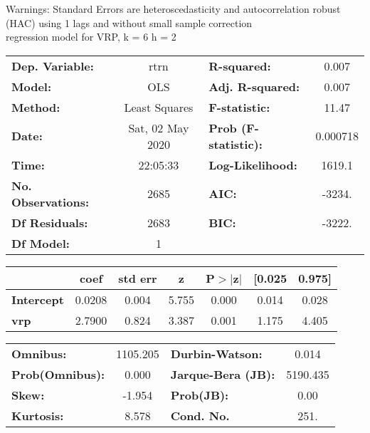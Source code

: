 Warnings: \newline
 [1] Standard Errors are heteroscedasticity and autocorrelation robust (HAC) using 1 lags and without small sample correction\\ 

regression model for VRP, k = 6 h = 2\begin{center}
\begin{tabular}{lclc}
\toprule
\textbf{Dep. Variable:}    &       rtrn       & \textbf{  R-squared:         } &     0.007   \\
\textbf{Model:}            &       OLS        & \textbf{  Adj. R-squared:    } &     0.007   \\
\textbf{Method:}           &  Least Squares   & \textbf{  F-statistic:       } &     11.47   \\
\textbf{Date:}             & Sat, 02 May 2020 & \textbf{  Prob (F-statistic):} &  0.000718   \\
\textbf{Time:}             &     22:05:33     & \textbf{  Log-Likelihood:    } &    1619.1   \\
\textbf{No. Observations:} &        2685      & \textbf{  AIC:               } &    -3234.   \\
\textbf{Df Residuals:}     &        2683      & \textbf{  BIC:               } &    -3222.   \\
\textbf{Df Model:}         &           1      & \textbf{                     } &             \\
\bottomrule
\end{tabular}
\begin{tabular}{lcccccc}
                   & \textbf{coef} & \textbf{std err} & \textbf{z} & \textbf{P$> |$z$|$} & \textbf{[0.025} & \textbf{0.975]}  \\
\midrule
\textbf{Intercept} &       0.0208  &        0.004     &     5.755  &         0.000        &        0.014    &        0.028     \\
\textbf{vrp}       &       2.7900  &        0.824     &     3.387  &         0.001        &        1.175    &        4.405     \\
\bottomrule
\end{tabular}
\begin{tabular}{lclc}
\textbf{Omnibus:}       & 1105.205 & \textbf{  Durbin-Watson:     } &    0.014  \\
\textbf{Prob(Omnibus):} &   0.000  & \textbf{  Jarque-Bera (JB):  } & 5190.435  \\
\textbf{Skew:}          &  -1.954  & \textbf{  Prob(JB):          } &     0.00  \\
\textbf{Kurtosis:}      &   8.578  & \textbf{  Cond. No.          } &     251.  \\
\bottomrule
\end{tabular}
\end{center}

